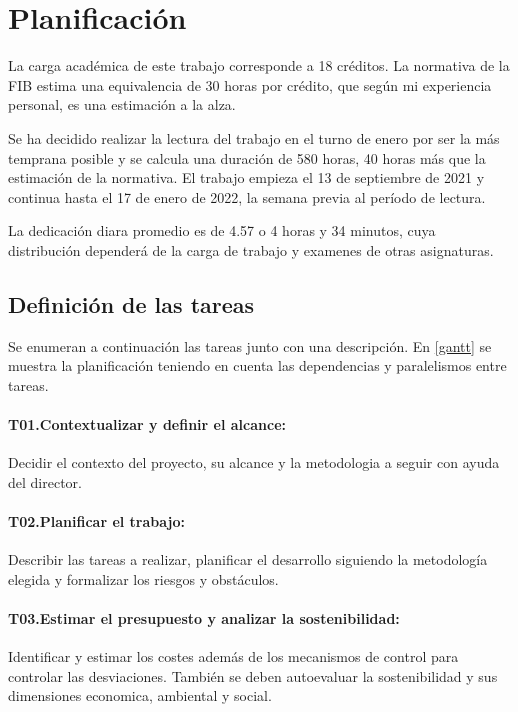 
\section{Planificación}\label{desctasks}
La carga académica de este trabajo corresponde a 18 créditos. La normativa
de la FIB estima una equivalencia de 30 horas por crédito, que según mi experiencia
personal, es una estimación a la alza.

Se ha decidido realizar la lectura del trabajo en el turno de enero por ser la más
temprana posible y se calcula una duración de 580 horas, 40 horas más que la
estimación de la normativa. El trabajo empieza el 13 de septiembre
de 2021 y continua hasta el 17 de enero de 2022, la semana previa al período de lectura.

La dedicación diara promedio es de 4.57 o 4 horas y 34 minutos, cuya distribución dependerá
de la carga de trabajo y examenes de otras asignaturas.

\subsection{Definición de las tareas}
Se enumeran a continuación las tareas junto con una descripción. En \ref{gantt} se muestra la planificación teniendo
en cuenta las dependencias y paralelismos entre tareas.
\paragraph{T01.\quad Contextualizar y definir el alcance:}\label{T01}
Decidir el contexto del proyecto, su alcance y la metodologia a seguir con ayuda
del director.
\paragraph{T02.\quad Planificar el trabajo:}\label{T02}
Describir las tareas a realizar, planificar el desarrollo siguiendo la
metodología elegida y formalizar los riesgos y obstáculos.
\paragraph{T03.\quad Estimar el presupuesto y analizar la sostenibilidad:}\label{T03}
Identificar y estimar los costes además de los mecanismos de control para controlar las
desviaciones. También se deben autoevaluar la sostenibilidad y sus dimensiones economica,
ambiental y social.
